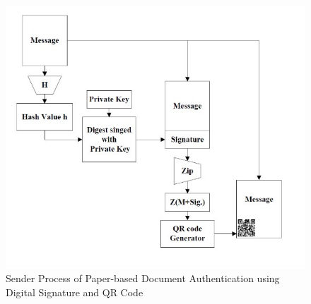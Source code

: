     \begin{figure}[H]
        \centering
        \includegraphics[width=\textwidth]{imgs/figure_2.1.1.jpg}
        \caption{Sender Process of Paper-based Document Authentication using Digital Signature and QR Code }
        \label{fig:Receiver Process of Paper-based Document Authentication using Digital Signature and QR Code}
        \end{figure}

